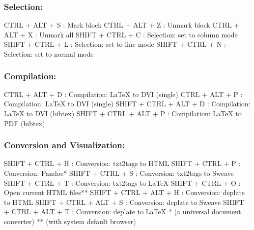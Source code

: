 \subsubsection{Selection:}

\vspace{-0.5cm}
\begin{Rtables}[caption={[Selection keyboard shortcuts]
    Selection keyboard shortcuts},
  label=hotkey:selection]
  CTRL  + ALT  + S        : Mark block
  CTRL  + ALT  + Z        : Unmark block
  CTRL  + ALT  + X        : Unmark all
  SHIFT + CTRL + C        : Selection: set to column mode
  SHIFT + CTRL + L        : Selection: set to line mode
  SHIFT + CTRL + N        : Selection: set to normal mode
\end{Rtables}


\subsubsection{Compilation:}

\vspace{-0.5cm}
\begin{Rtables}[caption={[Compilation keyboard shortcuts]
    Compilation keyboard shortcuts},
  label=hotkey:compilation]
  CTRL  + ALT  + D       : Compilation: LaTeX to DVI (single)
  CTRL  + ALT  + P       : Compilation: LaTeX to DVI (single)
  SHIFT + CTRL + ALT + D : Compilation: LaTeX to DVI (bibtex)
  SHIFT + CTRL + ALT + P : Compilation: LaTeX to PDF (bibtex)
\end{Rtables}


\subsubsection{Conversion and Visualization:}

\vspace{-0.5cm}
\begin{Rtables}[caption={[Conversion and visualization keyboard shortcuts]
    Conversion and visualization keyboard shortcuts},
  label=hotkey:conversion]
  SHIFT + CTRL + H       : Conversion: txt2tags to HTML
  SHIFT + CTRL + P       : Conversion: Pandoc*
  SHIFT + CTRL + S       : Conversion: txt2tags to Sweave
  SHIFT + CTRL + T       : Conversion: txt2tags to LaTeX
  SHIFT + CTRL + O       : Open current HTML files**
  SHIFT + CTRL + ALT + H : Conversion: deplate to HTML
  SHIFT + CTRL + ALT + S : Conversion: deplate to Sweave
  SHIFT + CTRL + ALT + T : Conversion: deplate to LaTeX
  *  (a universal document converter)
  ** (with system default browser)
\end{Rtables}


